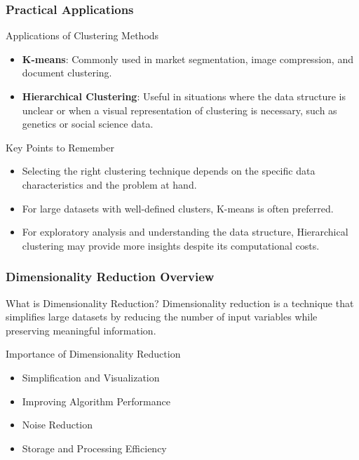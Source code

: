 \documentclass[aspectratio=169]{beamer}
\begin{document}
\begin{frame}[fragile]
    \frametitle{Practical Applications}

    \begin{block}{Applications of Clustering Methods}
        \begin{itemize}
            \item \textbf{K-means}: Commonly used in market segmentation, image compression, and document clustering.
            \item \textbf{Hierarchical Clustering}: Useful in situations where the data structure is unclear or when a visual representation of clustering is necessary, such as genetics or social science data.
        \end{itemize}
    \end{block}

    \begin{block}{Key Points to Remember}
        \begin{itemize}
            \item Selecting the right clustering technique depends on the specific data characteristics and the problem at hand.
            \item For large datasets with well-defined clusters, K-means is often preferred.
            \item For exploratory analysis and understanding the data structure, Hierarchical clustering may provide more insights despite its computational costs.
        \end{itemize}
    \end{block}
\end{frame}

\begin{frame}[fragile]
    \frametitle{Dimensionality Reduction Overview}
    \begin{block}{What is Dimensionality Reduction?}
        Dimensionality reduction is a technique that simplifies large datasets by reducing the number of input variables while preserving meaningful information.
    \end{block}
    
    \begin{block}{Importance of Dimensionality Reduction}
        \begin{itemize}
            \item Simplification and Visualization
            \item Improving Algorithm Performance
            \item Noise Reduction
            \item Storage and Processing Efficiency
        \end{itemize}
    \end{block}
\end{frame}
\end{document}
